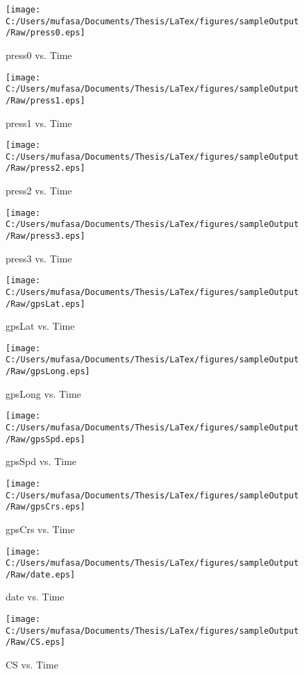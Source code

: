 \begin{figure}[]
	\centering
	\caption{press0 vs. Time}
		\texttt{[image: C:/Users/mufasa/Documents/Thesis/LaTex/figures/sampleOutput/Raw/press0.eps]}
\end{figure}
\begin{figure}[]
	\centering
	\caption{press1 vs. Time}
		\texttt{[image: C:/Users/mufasa/Documents/Thesis/LaTex/figures/sampleOutput/Raw/press1.eps]}
\end{figure}
\begin{figure}[]
	\centering
	\caption{press2 vs. Time}
		\texttt{[image: C:/Users/mufasa/Documents/Thesis/LaTex/figures/sampleOutput/Raw/press2.eps]}
\end{figure}
\begin{figure}[]
	\centering
	\caption{press3 vs. Time}
		\texttt{[image: C:/Users/mufasa/Documents/Thesis/LaTex/figures/sampleOutput/Raw/press3.eps]}
\end{figure}
\begin{figure}[]
	\centering
	\caption{gpsLat vs. Time}
		\texttt{[image: C:/Users/mufasa/Documents/Thesis/LaTex/figures/sampleOutput/Raw/gpsLat.eps]}
\end{figure}
\begin{figure}[]
	\centering
	\caption{gpsLong vs. Time}
		\texttt{[image: C:/Users/mufasa/Documents/Thesis/LaTex/figures/sampleOutput/Raw/gpsLong.eps]}
\end{figure}
\begin{figure}[]
	\centering
	\caption{gpsSpd vs. Time}
		\texttt{[image: C:/Users/mufasa/Documents/Thesis/LaTex/figures/sampleOutput/Raw/gpsSpd.eps]}
\end{figure}
\begin{figure}[]
	\centering
	\caption{gpsCrs vs. Time}
		\texttt{[image: C:/Users/mufasa/Documents/Thesis/LaTex/figures/sampleOutput/Raw/gpsCrs.eps]}
\end{figure}
\begin{figure}[]
	\centering
	\caption{date vs. Time}
		\texttt{[image: C:/Users/mufasa/Documents/Thesis/LaTex/figures/sampleOutput/Raw/date.eps]}
\end{figure}
\begin{figure}[]
	\centering
	\caption{CS vs. Time}
		\texttt{[image: C:/Users/mufasa/Documents/Thesis/LaTex/figures/sampleOutput/Raw/CS.eps]}
\end{figure}
